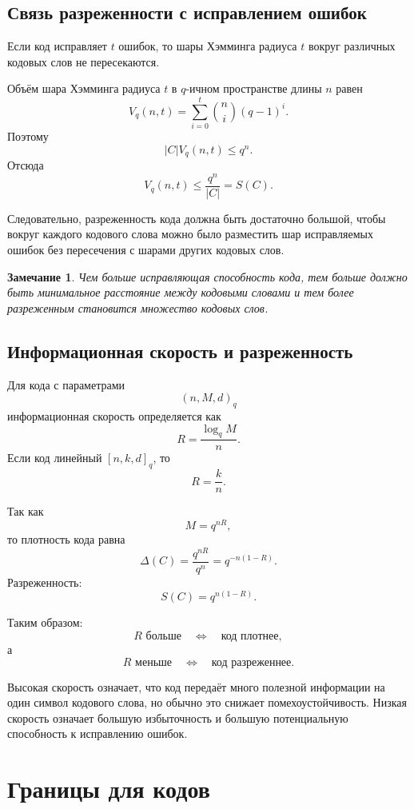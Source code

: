 \documentclass[12pt,a4paper]{article}
\newtheorem{remark}{Замечание}[section]
\begin{document}
\subsection{Связь разреженности с исправлением ошибок}

Если код исправляет $t$ ошибок, то шары Хэмминга радиуса $t$ вокруг различных кодовых слов не пересекаются.

Объём шара Хэмминга радиуса $t$ в $q$-ичном пространстве длины $n$ равен
\[
    V_q(n,t)=\sum_{i=0}^{t}\binom{n}{i}(q-1)^i.
\]
Поэтому
\[
    |C|V_q(n,t)\le q^n.
\]
Отсюда
\[
    V_q(n,t)\le \frac{q^n}{|C|}=S(C).
\]

Следовательно, разреженность кода должна быть достаточно большой, чтобы вокруг каждого кодового слова можно было разместить шар исправляемых ошибок без пересечения с шарами других кодовых слов.

\begin{remark}
Чем больше исправляющая способность кода, тем больше должно быть минимальное расстояние между кодовыми словами и тем более разреженным становится множество кодовых слов.
\end{remark}

\subsection{Информационная скорость и разреженность}

Для кода с параметрами
\[
    (n,M,d)_q
\]
информационная скорость определяется как
\[
    R=\frac{\log_q M}{n}.
\]
Если код линейный $[n,k,d]_q$, то
\[
    R=\frac{k}{n}.
\]

Так как
\[
    M=q^{nR},
\]
то плотность кода равна
\[
    \Delta(C)=\frac{q^{nR}}{q^n}=q^{-n(1-R)}.
\]
Разреженность:
\[
    S(C)=q^{n(1-R)}.
\]

Таким образом:
\[
    R\text{ больше}
    \quad\Longleftrightarrow\quad
    \text{код плотнее},
\]
а
\[
    R\text{ меньше}
    \quad\Longleftrightarrow\quad
    \text{код разреженнее}.
\]

Высокая скорость означает, что код передаёт много полезной информации на один символ кодового слова, но обычно это снижает помехоустойчивость. Низкая скорость означает большую избыточность и большую потенциальную способность к исправлению ошибок.

\section{Границы для кодов}
\end{document}
